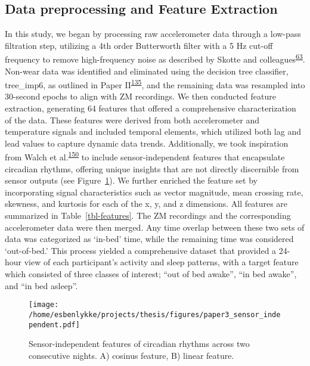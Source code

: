 \documentclass[
  10pt,
]{scrbook}
\begin{document}
\hypertarget{data-preprocessing-and-feature-extraction}{%
\subsection{Data preprocessing and Feature
Extraction}\label{data-preprocessing-and-feature-extraction}}

In this study, we began by processing raw accelerometer data through a
low-pass filtration step, utilizing a 4th order Butterworth filter with
a 5 Hz cut-off frequency to remove high-frequency noise as described by
Skotte and
colleagues\textsuperscript{\protect\hyperlink{ref-skotte_detection_2014}{63}}.
Non-wear data was identified and eliminated using the decision tree
classifier, tree\_imp6, as outlined in Paper
II\textsuperscript{\protect\hyperlink{ref-skovgaard_generalizability_2023}{135}},
and the remaining data was resampled into 30-second epochs to align with
ZM recordings. We then conducted feature extraction, generating 64
features that offered a comprehensive characterization of the data.
These features were derived from both accelerometer and temperature
signals and included temporal elements, which utilized both lag and lead
values to capture dynamic data trends. Additionally, we took inspiration
from Walch et
al.\textsuperscript{\protect\hyperlink{ref-walch_sleep_2019}{150}} to
include sensor-independent features that encapsulate circadian rhythms,
offering unique insights that are not directly discernible from sensor
outputs (see Figure~\ref{fig-paper3_sensor_independent}). We further
enriched the feature set by incorporating signal characteristics such as
vector magnitude, mean crossing rate, skewness, and kurtosis for each of
the x, y, and z dimensions. All features are summarized in
Table~\ref{tbl-features}. The ZM recordings and the corresponding
accelerometer data were then merged. Any time overlap between these two
sets of data was categorized as `in-bed' time, while the remaining time
was considered `out-of-bed.' This process yielded a comprehensive
dataset that provided a 24-hour view of each participant's activity and
sleep patterns, with a target feature which consisted of three classes
of interest; ``out of bed awake'', ``in bed awake'', and ``in bed
asleep''.

\begin{figure}

{\centering \texttt{[image: /home/esbenlykke/projects/thesis/figures/paper3\_sensor\_independent.pdf]}

}

\caption{\label{fig-paper3_sensor_independent}Sensor-independent
features of circadian rhythms across two consecutive nights. A) cosinus
feature, B) linear feature.}

\end{figure}
\end{document}
